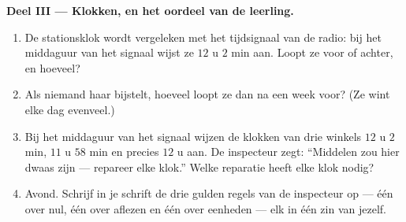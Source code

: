 \begin{problem}
\medskip\noindent\textbf{Deel III --- Klokken, en het oordeel van de
leerling.}
\begin{enumerate}[resume]
  \item De stationsklok wordt vergeleken met het tijdsignaal van de
        radio: bij het middaguur van het signaal wijst ze $12$ u
        $2$ min aan. Loopt ze voor of achter, en hoeveel?
  \item Als niemand haar bijstelt, hoeveel loopt ze dan na een week
        voor? (Ze wint elke dag evenveel.)
  \item Bij het middaguur van het signaal wijzen de klokken van drie
        winkels $12$ u $2$ min, $11$ u $58$ min en precies $12$ u
        aan. De inspecteur zegt: ``Middelen zou hier dwaas zijn ---
        repareer elke klok.'' Welke reparatie heeft elke klok nodig?
  \item Avond. Schrijf in je schrift de drie gulden regels van de
        inspecteur op --- één over nul, één over aflezen en één over
        eenheden --- elk in één zin van jezelf.
\end{enumerate}
\end{problem}
